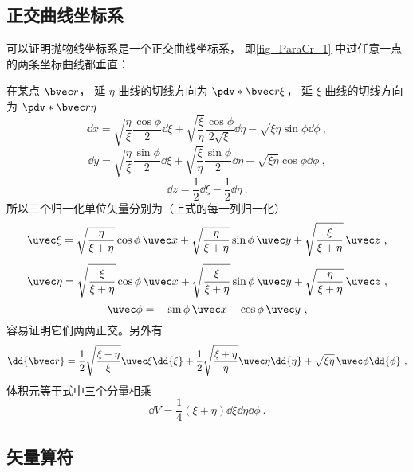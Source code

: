 
\subsection{正交曲线坐标系}
可以证明抛物线坐标系是一个正交曲线坐标系， 即\autoref{fig_ParaCr_1} 中过任意一点的两条坐标曲线都垂直：

在某点 $\bvec r$， 延 $\eta$ 曲线的切线方向为 $\pdv*{\bvec r}{\xi}$， 延 $\xi$ 曲线的切线方向为 $\pdv*{\bvec r}{\eta}$
\begin{equation}
\dd{x} = \sqrt{\frac{\eta}{\xi}}\frac{\cos\phi}{2}\dd{\xi} + \sqrt{\frac{\xi}{\eta}}\frac{\cos\phi}{2\sqrt{\xi}}\dd{\eta} - \sqrt{\xi\eta}\sin\phi\dd{\phi}~,
\end{equation}
\begin{equation}
\dd{y} = \sqrt{\frac{\eta}{\xi}}\frac{\sin\phi}{2}\dd{\xi} + \sqrt{\frac{\xi}{\eta}}\frac{\sin\phi}{2}\dd{\eta} + \sqrt{\xi\eta}\cos\phi\dd{\phi}~,
\end{equation}
\begin{equation}
\dd{z} = \frac{1}{2}\dd{\xi} - \frac{1}{2}\dd{\eta}~.
\end{equation}
所以三个归一化单位矢量分别为（上式的每一列归一化）
\begin{equation}
\uvec \xi = \sqrt{\frac{\eta}{\xi+\eta}}\cos\phi\,\uvec x + \sqrt{\frac{\eta}{\xi+\eta}}\sin\phi\,\uvec y + \sqrt{\frac{\xi}{\xi+\eta}}\,\uvec z~,
\end{equation}
\begin{equation}
\uvec \eta = \sqrt{\frac{\xi}{\xi+\eta}}\cos\phi\,\uvec x + \sqrt{\frac{\xi}{\xi+\eta}}\sin\phi\,\uvec y + \sqrt{\frac{\eta}{\xi+\eta}}\,\uvec z~,
\end{equation}
\begin{equation}
\uvec \phi = -\sin\phi \,\uvec x + \cos\phi \,\uvec y~,
\end{equation}
容易证明它们两两正交。另外有
\begin{equation}\label{eq_ParaCr_4}
\dd{\bvec r} = \frac{1}{2}\sqrt{\frac{\xi + \eta}{\xi}} \uvec \xi \dd{\xi}
+ \frac{1}{2}\sqrt{\frac{\xi + \eta}{\eta}} \uvec \eta \dd{\eta}
+ \sqrt{\xi\eta}\, \uvec \phi \dd{\phi}~,
\end{equation}
体积元等于式中三个分量相乘
\begin{equation}
\dd{V} = \frac{1}{4} (\xi + \eta) \dd{\xi}\dd{\eta}\dd{\phi}~.
\end{equation}

\subsection{矢量算符}

